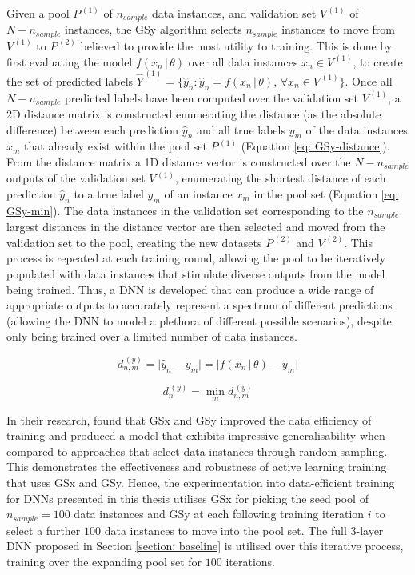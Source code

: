 \documentclass[a4paper, 11pt]{report}
\begin{document}
    Given a pool $P^{\,(1)}$ of $n_{sample}$ data instances, and validation set $V^{\,(1)}$ of $N - n_{sample}$ instances, the GSy algorithm selects $n_{sample}$ instances to move from $V^{\,(1)}$ to $P^{\,(2)}$ believed to provide the most utility to training. This is done by first evaluating the model $f( x_n \, \vert \, \theta )$ over all data instances $x_n \in V^{\,(1)}$, to create the set of predicted labels $\hat{Y}^{\,(1)} = \big\{ \hat{y}_n \colon \hat{y}_n = f( x_n \, \vert \, \theta ), \, \forall x_n \in V^{\,(1)} \big\}$. Once all $N - n_{sample}$ predicted labels have been computed over the validation set $V^{\,(1)}$, a 2D distance matrix is constructed enumerating the distance (as the absolute difference) between each prediction $\hat{y}_n$ and all true labels $y_m$ of the data instances $x_m$ that already exist within the pool set $P^{\,(1)}$ (Equation \ref{eq: GSy-distance}). From the distance matrix a 1D distance vector is constructed over the $N - n_{sample}$ outputs of the validation set $V^{\,(1)}$, enumerating the shortest distance of each prediction $\hat{y}_n$ to a true label $y_m$ of an instance $x_m$ in the pool set (Equation \ref{eq: GSy-min}). The data instances in the validation set corresponding to the $n_{sample}$ largest distances in the distance vector are then selected and moved from the validation set to the pool, creating the new datasets $P^{\,(2)}$ and $V^{\,(2)}$. This process is repeated at each training round, allowing the pool to be iteratively populated with data instances that stimulate diverse outputs from the model being trained. Thus, a DNN is developed that can produce a wide range of appropriate outputs to accurately represent a spectrum of different predictions (allowing the DNN to model a plethora of different possible scenarios), despite only being trained over a limited number of data instances.


    \begin{equation}
        \label{eq: GSy-distance}
        d^{\,(y)}_{n, m} = \big\lvert \hat{y}_n - y_m \big\lvert = \big\lvert f( x_n \, \vert \, \theta ) - y_m \big\lvert
    \end{equation}
  
    \begin{equation}
        \label{eq: GSy-min}
        d^{\,(y)}_n = \min_m d^{\,(y)}_{n, m}
    \end{equation}


    In their research, \citet{wu-2019} found that GSx and GSy improved the data efficiency of training and produced a model that exhibits impressive generalisability when compared to approaches that select data instances through random sampling. This demonstrates the effectiveness and robustness of active learning training that uses GSx and GSy. Hence, the experimentation into data-efficient training for DNNs presented in this thesis utilises GSx for picking the seed pool of $n_{sample} = 100$ data instances and GSy at each following training iteration $i$ to select a further $100$ data instances to move into the pool set. The full $3$-layer DNN proposed in Section \ref{section: baseline} is utilised over this iterative process, training over the expanding pool set for $100$ iterations.
\end{document}
